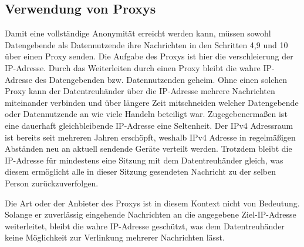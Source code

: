 \documentclass[11pt,a4paper]{scrreprt}
\begin{document}
\subsection{Verwendung von Proxys}
Damit eine vollständige Anonymität erreicht werden kann, müssen sowohl Datengebende als Datennutzende ihre Nachrichten in den Schritten 4,9 und 10 über einen Proxy senden. Die Aufgabe des Proxys ist hier die verschleierung der IP-Adresse. Durch das Weiterleiten durch einen Proxy bleibt die wahre IP-Adresse des Datengebenden bzw. Datennutzenden geheim. Ohne einen solchen Proxy kann der Datentreuhänder über die IP-Adresse mehrere Nachrichten miteinander verbinden und über längere Zeit mitschneiden welcher Datengebende oder Datennutzende an wie viele Handeln beteiligt war. Zugegebenermaßen ist eine dauerhaft gleichbleibende IP-Adresse eine Seltenheit. Der IPv4 Adressraum ist bereits seit mehreren Jahren erschöpft, weshalb IPv4 Adresse in regelmäßigen Abständen neu an aktuell sendende Geräte verteilt werden. Trotzdem bleibt die IP-Adresse für mindestens eine Sitzung mit dem Datentreuhänder gleich, was diesem ermöglicht alle in dieser Sitzung gesendeten Nachricht zu der selben Person zurückzuverfolgen. 

Die Art oder der Anbieter des Proxys ist in diesem Kontext nicht von Bedeutung. Solange er zuverlässig eingehende Nachrichten an die angegebene Ziel-IP-Adresse weiterleitet, bleibt die wahre IP-Adresse geschützt, was dem Datentreuhänder keine Möglichkeit zur Verlinkung mehrerer Nachrichten lässt.
\end{document}
